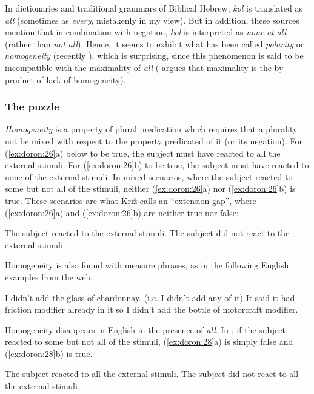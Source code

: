 \documentclass[output=paper]{langsci/langscibook}
\begin{document}
In dictionaries and traditional grammars of Biblical Hebrew, \textit{kol} is translated as \textit{all} (sometimes as \textit{every}, mistakenly in my view). But in addition, these sources mention that in combination with negation, \textit{kol} is interpreted as \textit{none} \textit{at} \textit{all} (rather than \textit{not} \textit{all}). Hence, it seems to exhibit what has been called \textit{polarity} \citep{Löbner2000} or \textit{homogeneity} (recently \citealt{Križ2016}), which is surprising, since this phenomenon is said to be incompatible with the maximality of \textit{all} (\citealt{Križ2016} argues that maximality is the by-product of lack of homogeneity).

\subsubsection{The puzzle}%

\textit{Homogeneity} is a property of plural predication which requires that a plurality not be mixed with respect to the property predicated of it (or its negation). For (\ref{ex:doron:26}a) below to be true, the subject must have reacted to all the external stimuli. For (\ref{ex:doron:26}b) to be true, the subject must have reacted to none of the external stimuli. In mixed scenarios, where the subject reacted to some but not all of the stimuli, neither (\ref{ex:doron:26}a) nor (\ref{ex:doron:26}b) is true. These scenarios are what Križ calls an “extension gap”, where (\ref{ex:doron:26}a) and (\ref{ex:doron:26}b) are neither true nor false:

\ea%
    \label{ex:doron:26}
\ea The subject reacted to the external stimuli.
\ex The subject did not react to the external stimuli.
\z
\z

Homogeneity is also found with measure phrases, as in the following English examples from the web.

\ea%
    \label{ex:doron:27}
    \ea I didn't add the glass of chardonnay.   (i.e. I didn't add any of it)
    \ex It said it had friction modifier already in it so I didn't add the bottle of motorcraft modifier.
\z
\z

Homogeneity disappears in English in the presence of \textit{all}. In , if the subject reacted to some but not all of the stimuli, (\ref{ex:doron:28}a) is simply false and (\ref{ex:doron:28}b) is true.

\ea%
    \label{ex:doron:28}
    \ea The subject reacted to all the external stimuli.
    \ex The subject did not react to all the external stimuli.
\z
\z
\end{document}
